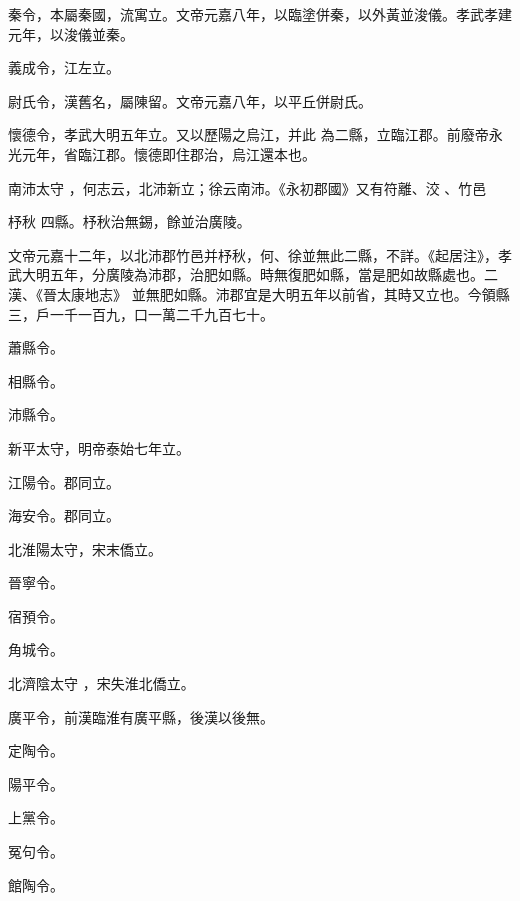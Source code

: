 \begin{pinyinscope}
 秦令，本屬秦國，流寓立。文帝元嘉八年，以臨塗併秦，以外黃並浚儀。孝武孝建元年，以浚儀並秦。



 義成令，江左立。



 尉氏令，漢舊名，屬陳留。文帝元嘉八年，以平丘併尉氏。



 懷德令，孝武大明五年立。又以歷陽之烏江，并此
 為二縣，立臨江郡。前廢帝永光元年，省臨江郡。懷德即住郡治，烏江還本也。


南沛太守
 ，何志云，北沛新立；徐云南沛。《永初郡國》又有符離、洨
 、竹邑


杼秋
 四縣。杼秋治無錫，餘並治廣陵。



 文帝元嘉十二年，以北沛郡竹邑并杼秋，何、徐並無此二縣，不詳。《起居注》，孝武大明五年，分廣陵為沛郡，治肥如縣。時無復肥如縣，當是肥如故縣處也。二漢、《晉太康地志》
 並無肥如縣。沛郡宜是大明五年以前省，其時又立也。今領縣三，戶一千一百九，口一萬二千九百七十。


蕭縣令。


相縣令。


沛縣令。



 新平太守，明帝泰始七年立。



 江陽令。郡同立。



 海安令。郡同立。



 北淮陽太守，宋末僑立。


晉寧令。


宿預令。


角城令。


北濟陰太守
 ，宋失淮北僑立。



 廣平令，前漢臨淮有廣平縣，後漢以後無。


定陶令。


陽平令。


上黨令。


冤句令。


館陶令。



\end{pinyinscope}
